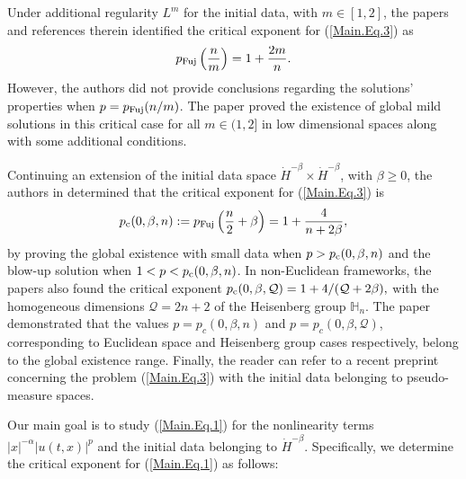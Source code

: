 \documentclass[11pt,reqno]{amsart}
\begin{document}
Under additional regularity $L^m$ for the initial data, with $m \in [1,2]$, the papers \cite{IkehataOhta2002, DabbiccoEbert2017} and references therein identified the critical exponent for (\ref{Main.Eq.3}) as
$$ p_{\rm Fuj}\left(\frac{n}{m}\right) =  1 + \frac{2m}{n}.$$ However, the authors did not provide conclusions regarding the solutions' properties when $p = p_{\rm Fuj}(n/m)$. The paper \cite{Ikeda2019} proved
the existence of global mild solutions in this critical case for all $m \in (1,2]$ in low dimensional spaces along with some additional conditions.


Continuing an extension of the initial data space $  \dot{H}^{-\beta} \times \dot{H}^{-\beta}$, with $\beta \geq 0$, the authors in \cite{ChenReissig2023} determined that the critical exponent for (\ref{Main.Eq.3}) is 
        \begin{align*}
            p_{\rm c}(0,\beta,n) := p_{\rm Fuj}\left(\frac{n}{2}+\beta\right) = 1+ \frac{4}{n+2\beta}, 
        \end{align*}
by proving the global existence with small data when $p > p_{\rm c}(0,\beta,n)$ and the blow-up solution when $1< p < p_{\rm c}(0,\beta,n)$. In non-Euclidean frameworks, the papers \cite{Dasgupta2024} also found the critical exponent
        $p_{\rm c}(0,\beta, \mathcal{Q}) =  1+ 4/(\mathcal{Q}+2\beta),$ 
with the homogeneous dimensions $\mathcal{Q}=2n+2$ of the Heisenberg group $\mathbb{H}_n$. The paper \cite{Dabbicco2024} demonstrated that the values $p=p_c(0, \beta, n)$ and $p=p_c(0, \beta, \mathcal{Q})$, corresponding to Euclidean space and Heisenberg group cases respectively, belong to the global existence range.  Finally, the reader can refer to a recent preprint \cite{TangDuongPhan2026} concerning the problem (\ref{Main.Eq.3}) with the initial data belonging to pseudo-measure spaces. \medskip

Our main goal is to study (\ref{Main.Eq.1}) for the nonlinearity terms $|x|^{-\alpha} |u(t,x)|^p$  and the initial data belonging to $\dot{H}^{-\beta}$. Specifically, we determine the critical exponent for (\ref{Main.Eq.1}) as follows:
\end{document}
